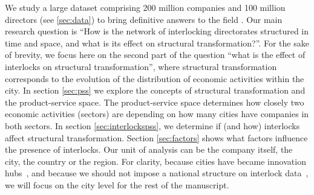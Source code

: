 We study a large dataset comprising 200 million companies and 100 million directors (see \ref{sec:data}) to bring definitive answers to the field .
Our main research question is ``How is the network of interlocking directorates structured in time and space, and what is its effect on structural transformation?''.
For the sake of brevity, we focus here on the second part of the question ``what is the effect of interlocks on structural transformation'',
where structural transformation corresponds to the evolution of the distribution of economic activities within the city.
In section \ref{sec:pss} we explore the concepts of structural transformation and the product-service space.
The product-service space determines how closely two economic activities (sectors) are depending on how many cities have companies in both sectors.
In section \ref{sec:interlockspss}, we determine if (and how) interlocks affect structural transformation.
Section \ref{sec:factors} shows what factors influence the presence of interlocks.
Our unit of analysis can be the company itself, the city, the country or the region. 
For clarity, 
because cities have became innovation hubs~\citep{Belderbos2014}, 
and because we should not impose a national structure on interlock data~\citep{Heemskerk2016},
we will focus on the city level for the rest of the manuscript.


